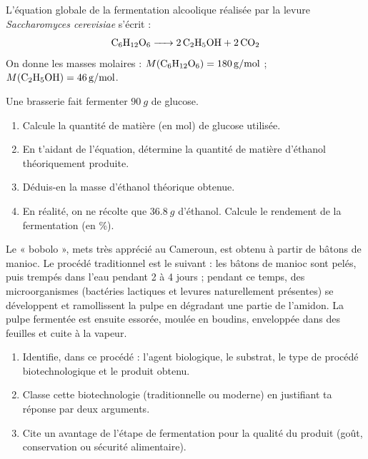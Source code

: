 \documentclass[11pt]{article}
\newcounter{popsec}
\newcounter{popsub}
\newcommand{\courssub}[1]{%
  \stepcounter{popsub}%
  \par\vspace{9pt}\noindent{\popxbold\fontsize{11.5}{13}\selectfont\color{popink}{\color{poporange}\thepopsec.\thepopsub}\hspace{6pt}#1}\par\nopagebreak\vspace{4pt}
}
\begin{document}
\begin{exercice}
L'équation globale de la fermentation alcoolique réalisée par la levure \emph{Saccharomyces cerevisiae} s'écrit :
\[ \ce{C6H12O6 -> 2 C2H5OH + 2 CO2} \]
On donne les masses molaires : $M(\ce{C6H12O6}) = \SI{180}{g/mol}$ ; $M(\ce{C2H5OH}) = \SI{46}{g/mol}$.

Une brasserie fait fermenter $\SI{90}{g}$ de glucose.
\begin{enumerate}
\item Calcule la quantité de matière (en mol) de glucose utilisée.
\item En t'aidant de l'équation, détermine la quantité de matière d'éthanol théoriquement produite.
\item Déduis-en la masse d'éthanol théorique obtenue.
\item En réalité, on ne récolte que $\SI{36,8}{g}$ d'éthanol. Calcule le rendement de la fermentation (en \%).
\end{enumerate}
\end{exercice}

\courssub{Je m'entraîne}

\begin{exercice}
Le « bobolo », mets très apprécié au Cameroun, est obtenu à partir de bâtons de manioc. Le procédé traditionnel est le suivant : les bâtons de manioc sont pelés, puis trempés dans l'eau pendant 2 à 4 jours ; pendant ce temps, des microorganismes (bactéries lactiques et levures naturellement présentes) se développent et ramollissent la pulpe en dégradant une partie de l'amidon. La pulpe fermentée est ensuite essorée, moulée en boudins, enveloppée dans des feuilles et cuite à la vapeur.

\begin{enumerate}
\item Identifie, dans ce procédé : l'agent biologique, le substrat, le type de procédé biotechnologique et le produit obtenu.
\item Classe cette biotechnologie (traditionnelle ou moderne) en justifiant ta réponse par deux arguments.
\item Cite un avantage de l'étape de fermentation pour la qualité du produit (goût, conservation ou sécurité alimentaire).
\end{enumerate}
\end{exercice}
\end{document}
